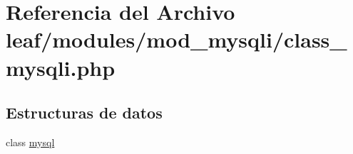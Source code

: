 \hypertarget{class__mysqli_8php}{\section{Referencia del Archivo leaf/modules/mod\-\_\-mysqli/class\-\_\-mysqli.php}
\label{class__mysqli_8php}
}
\subsection*{Estructuras de datos}
\begin{DoxyCompactItemize}
\item 
class \hyperlink{classmysql}{mysql}
\end{DoxyCompactItemize}
